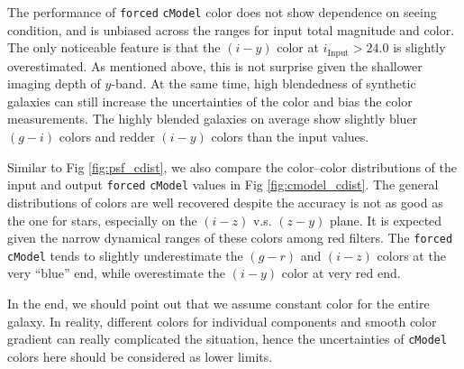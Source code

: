 \documentclass[useamsfonts]{pasj01}
\def\cmodel{\texttt{cModel}}
\def\forced{\texttt{forced}}
\begin{document}
    The performance of \forced{} \cmodel{} color does not show dependence on seeing
    condition, and is unbiased across the ranges for input total magnitude and color.
    The only noticeable feature is that the $(i-y)$ color at 
    $i_{\mathrm{Input}}>24.0$ is slightly overestimated. 
    As mentioned above, this is not surprise given the shallower imaging depth of 
    $y$-band.    
    At the same time, high blendedness of synthetic galaxies can still increase the 
    uncertainties of the color and bias the color measurements.
    The highly blended galaxies on average show slightly bluer $(g-i)$ 
    colors and redder $(i-y)$ colors than the input values.
    
    Similar to Fig \ref{fig:psf_cdist}, we also compare the color--color distributions 
    of the input and output \forced{} \cmodel{} values in Fig \ref{fig:cmodel_cdist}. 
    The general distributions of colors are well recovered despite the accuracy is 
    not as good as the one for stars, especially on the $(i-z)$ v.s. $(z-y)$ plane. 
    It is expected given the narrow dynamical ranges of these colors among red filters.
    The \forced{} \cmodel{} tends to slightly underestimate the $(g-r)$ and $(i-z)$ 
    colors at the very ``blue'' end, while overestimate the $(i-y)$ color at very 
    red end. 
    
    In the end, we should point out that we assume constant color for the entire galaxy.  
    In reality, different colors for individual components and smooth color gradient 
    can really complicated the situation, hence the uncertainties of \cmodel{} colors 
    here should be considered as lower limits.
\end{document}
